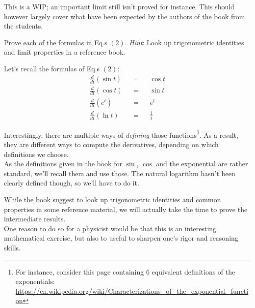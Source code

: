 \documentclass[solutions.tex]{subfiles}
\begin{document}
\maketitle
\begin{remark} This is a WIP; an important limit still isn't proved
for instance. This should however largely cover what have been expected
by the authors of the book from the students.
\end{remark}
\begin{exercise} Prove each of the formulas in Eq.s $(2)$.
\textit{Hint}: Look up trigonometric identities and limit
properties in a reference book.
\end{exercise}

Let's recall the formulas of Eq.s $(2)$:
\begin{equation*} \begin{aligned}
	\frac{d}{dt}(\sin t) &&=&& \cos t \\
	\frac{d}{dt}(\cos t) &&=&& \sin t \\
	\frac{d}{dt}(e^t) &&=&& e^t \\
	\frac{d}{dt}(\ln t) &&=&& \frac{1}{t}
\end{aligned} \end{equation*}

\begin{remark}
Interestingly, there are multiple ways of \textit{defining}
those functions\footnote{For instance, consider this page
containing $6$ equivalent definitions of the exponentials:
\url{https://en.wikipedia.org/wiki/Characterizations\_of\_the\_exponential\_function}}.
As a result, they are different ways to compute the derivatives,
depending on which definitions we choose. \\

As the definitions given in the book for $\sin$, $\cos$ and
the exponential are rather standard, we'll recall them and use
those. The natural logarithm hasn't been clearly defined though,
so we'll have to do it.
\end{remark}
\begin{remark} While the book suggest to look up trigonometric
identities and common properties in some reference material, we
will actually take the time to prove the intermediate results. \\

One reason to do so for a physicist would be that this is an
interesting mathematical exercise, but also to useful to sharpen
one's rigor and reasoning skills.
\end{remark}
\end{document}
